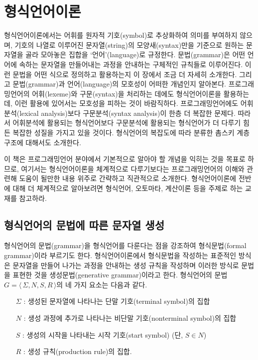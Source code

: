 \chapter{형식언어이론}

형식언어이론에서는 어휘를 원자적 기호(symbol)로 추상화하여 의미를 부여하지 않으며,
기호의 나열로 이루어진 문자열(string)의 모양새(syntax)만을 기준으로 원하는 문자열을
골라 모아놓은 집합을 `언어'(language)로 규정한다. 문법(grammar)은 어떤 언어에 속하는
문자열을 만들어내는 과정을 안내하는 구체적인 규칙들로 이루어진다. 이런 문법을
어떤 식으로 정의하고 활용하는지 이 장에서 조금 더 자세히 소개한다. 그리고
문법(grammar)과 언어(language)의 모호성이 어떠한 개념인지 알아본다.
프로그래밍언어의 어휘(lexeme)와 구문(syntax)을 처리하는 데에도 형식언어이론을
활용하는데, 이런 활용에 있어서는 모호성을 피하는 것이 바람직하다.
프로그래밍언어에도 어휘분석(lexical analysis)보다 구문분석(syntax analysis)이
한층 더 복잡한 문제다. 따라서 어휘분석에 활용되는 형식언어보다 구문분석에 
활용되는 형식언어가 더 다루기 힘든 복잡한 성질을 가지고 있을 것이다.
형식언어의 복잡도에 따라 분류한 촘스키 계층 구조에 대해서도 소개한다.

이 책은 프로그래밍언어 분야에서 기본적으로 알아야 할 개념을 익히는
것을 목표로 하므로, 여기서는 형식언어이론을 체계적으로 다루기보다는
프로그래밍언어의 이해와 관련해 도움이 될만한 내용 위주로 간략하고 직관적으로 소개한다. 
형식언어이론에 전반에 대해 더 체계적으로 알아보려면 형식언어, 오토마타, 계산이론
등을 주제로 하는 교재\cite{Sipser2013,Hopcroft2007}를 참고하라.

\section{형식언어의 문법에 따른 문자열 생성}
\label{sec:GenGrammar}
형식언어의 문법(grammar)을 형식언어를 다룬다는 점을 강조하여 형식문법(formal grammar)이라
부르기도 한다. 형식언어이론에서 형식문법을 작성하는 표준적인 방식은 문자열을
만들어 나가는 과정을 안내하는 생성 규칙을 작성하며 이러한 방식로 문법을
표현한 것을 생성문법(generative grammar)이라고 한다. 형식언어의 문법
$G = \langle\, \Sigma, N, S, R \,\rangle$의 네 가지 요소는 다음과 같다.\vspace{-1ex}
\begin{itemize}\tightlist
    \item[$\Sigma$]: 생성된 문자열에 나타나는 단말 기호(terminal symbol)의 집합
    \item[$N$]: 생성 과정에 추가로 나타나는 비단말 기호(nonterminal symbol)의 집합
    \item[$S$]: 생성의 시작을 나타내는 시작 기호(start symbol) (단, $S\in N$)
    \item[$R$]: 생성 규칙(production rule)의 집합.
\end{itemize}

